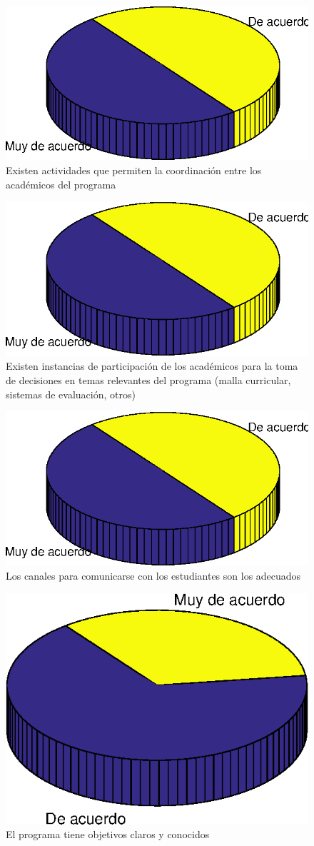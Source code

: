 \begin{figure}[ht]
\centering
\includegraphics[width=0.5\columnwidth]{./figure/graph5.eps}
\caption{Existen actividades que permiten la coordinación entre los académicos del programa}
\label{graph5}
\end{figure}

\begin{figure}[ht]
\centering
\includegraphics[width=0.5\columnwidth]{./figure/graph6.eps}
\caption{Existen instancias de participación de los académicos para la toma de decisiones en temas relevantes del programa (malla curricular, sistemas de evaluación, otros)}
\label{graph6}
\end{figure}

\begin{figure}[ht]
\centering
\includegraphics[width=0.5\columnwidth]{./figure/graph7.eps}
\caption{Los canales para comunicarse con los estudiantes son los adecuados}
\label{graph7}
\end{figure}

\begin{figure}[ht]
\centering
\includegraphics[width=0.5\columnwidth]{./figure/graph8.eps}
\caption{El programa tiene objetivos claros y conocidos}
\label{graph8}
\end{figure}

